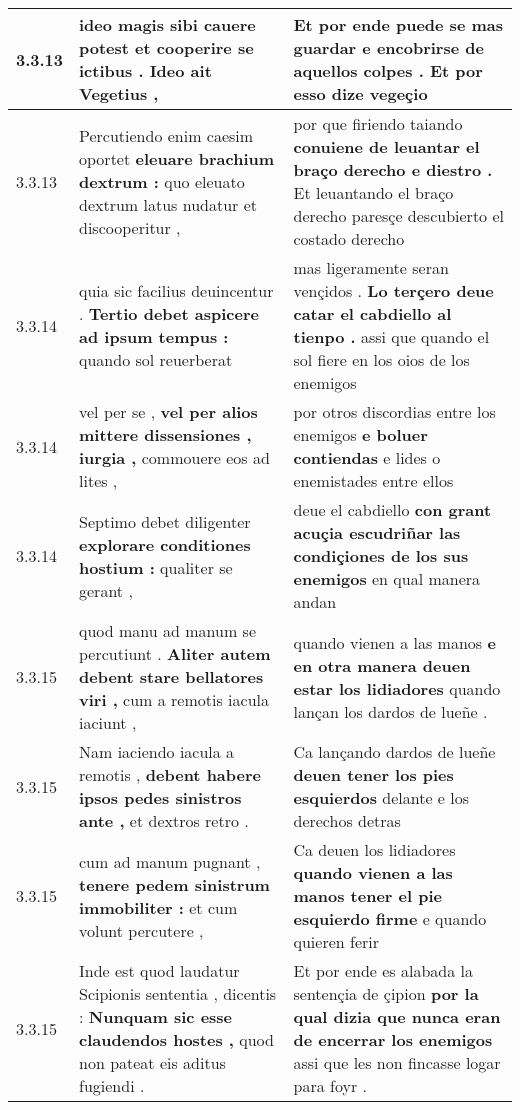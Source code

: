 \begin{tabular}{|p{1cm}|p{6.5cm}|p{6.5cm}|}
3.3.13 & ideo magis sibi cauere potest \textbf{ et cooperire se ictibus . } Ideo ait Vegetius , & Et por ende puede se mas guardar \textbf{ e encobrirse de aquellos colpes . } Et por esso dize vegeçio \\\hline
3.3.13 & Percutiendo enim caesim oportet \textbf{ eleuare brachium dextrum : } quo eleuato dextrum latus nudatur et discooperitur , & por que firiendo taiando \textbf{ conuiene de leuantar el braço derecho e diestro . } Et leuantando el braço derecho paresçe descubierto el costado derecho \\\hline
3.3.14 & quia sic facilius deuincentur . \textbf{ Tertio debet aspicere ad ipsum tempus : } quando sol reuerberat & mas ligeramente seran vençidos . \textbf{ Lo terçero deue catar el cabdiello al tienpo . } assi que quando el sol fiere en los oios de los enemigos \\\hline
3.3.14 & vel per se , \textbf{ vel per alios mittere dissensiones , iurgia , } commouere eos ad lites , & por otros discordias entre los enemigos \textbf{ e boluer contiendas } e lides o enemistades entre ellos \\\hline
3.3.14 & Septimo debet diligenter \textbf{ explorare conditiones hostium : } qualiter se gerant , & deue el cabdiello \textbf{ con grant acuçia escudriñar las condiçiones de los sus enemigos } en qual manera andan \\\hline
3.3.15 & quod manu ad manum se percutiunt . \textbf{ Aliter autem debent stare bellatores viri , } cum a remotis iacula iaciunt , & quando vienen a las manos \textbf{ e en otra manera deuen estar los lidiadores } quando lançan los dardos de lueñe . \\\hline
3.3.15 & Nam iaciendo iacula a remotis , \textbf{ debent habere ipsos pedes sinistros ante , } et dextros retro . & Ca lançando dardos de lueñe \textbf{ deuen tener los pies esquierdos } delante e los derechos detras \\\hline
3.3.15 & cum ad manum pugnant , \textbf{ tenere pedem sinistrum immobiliter : } et cum volunt percutere , & Ca deuen los lidiadores \textbf{ quando vienen a las manos tener el pie esquierdo firme } e quando quieren ferir \\\hline
3.3.15 & Inde est quod laudatur Scipionis sententia , dicentis : \textbf{ Nunquam sic esse claudendos hostes , } quod non pateat eis aditus fugiendi . & Et por ende es alabada la sentençia de çipion \textbf{ por la qual dizia que nunca eran de encerrar los enemigos } assi que les non fincasse logar para foyr . \\\hline

\end{tabular}
